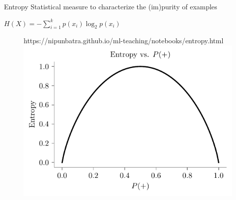 \documentclass[usenames,dvipsnames]{beamer}
\begin{document}
\begin{frame}{Entropy}
 Statistical measure to characterize the
(im)purity of examples

\pause $H(X) = -\sum_{i=1}^k p(x_i) \log_2 p(x_i)$

\begin{figure}[htp]
    \centering
    \begin{notebookbox}{https://nipunbatra.github.io/ml-teaching/notebooks/entropy.html}
      \includegraphics[scale=0.6]{../assets/decision-trees/figures/entropy.pdf}
    \end{notebookbox}
  \end{figure}

\end{frame}
	
\end{document}
